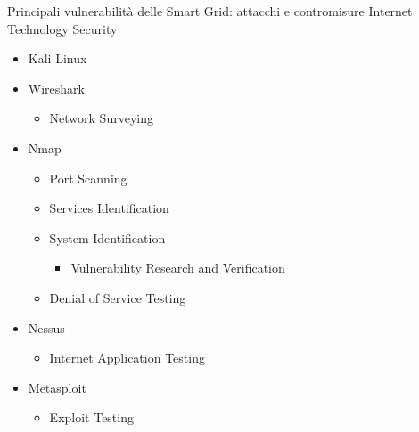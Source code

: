 \begin{frame}{Principali vulnerabilità delle Smart Grid: attacchi e contromisure}
Internet Technology Security
	\begin{itemize}[<+- | alert@+>]
		\item Kali Linux
		\item Wireshark
		\begin{itemize}
			\item Network Surveying
		\end{itemize}
		\item Nmap
		\begin{itemize}
			\item Port Scanning
			\item Services Identification
			\item System Identification
			\begin{itemize}
				\item Vulnerability Research and Verification
			\end{itemize}
			\item Denial of Service Testing
		\end{itemize}
		\item Nessus
		\begin{itemize}
			\item Internet Application Testing
		\end{itemize}
		\item Metasploit
		\begin{itemize}
			\item Exploit Testing
		\end{itemize}
	\end{itemize}
\end{frame}

